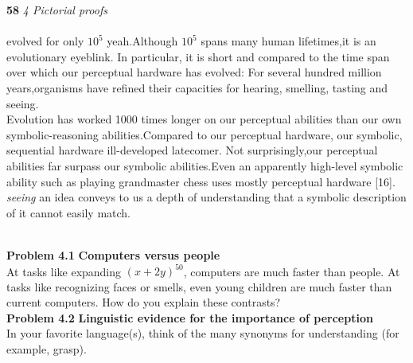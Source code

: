 \documentclass [a4paper]{article}
\begin{document}
\newpage
\pagestyle{fancy}
\begin{justify}
\Large{\textbf{58}} \hspace{11.3cm} \large{\textit{4 Pictorial proofs}}\\
\vspace*{0.4cm}\\
\Large evolved for only $10^5$ yeah.Although $10^5$ spans many human lifetimes,it is an evolutionary eyeblink. In particular, it is short and compared to the time span over which our perceptual hardware has evolved: For several hundred million years,organisms have refined their capacities for hearing, smelling, tasting and seeing.\\

\vspace*{2mm}
\noindent Evolution has worked 1000 times longer on our perceptual abilities than our own symbolic-reasoning abilities.Compared to our perceptual hardware, our symbolic, sequential hardware ill-developed latecomer. Not surprisingly,our perceptual abilities far surpass our symbolic abilities.Even an apparently high-level symbolic ability such as playing grandmaster chess uses mostly perceptual hardware [16]. \textit{seeing} an idea conveys to us a depth of understanding that a symbolic description of it cannot easily match.\\
\vspace*{0.5mm}\\
\colorbox{light-gray}{\begin{minipage}{\textwidth}
\begin{justify}
\textbf{\hspace*{3mm} \large Problem 4.1} \hspace{3mm} \textbf{ \large Computers versus people}\\
\hspace{2cm} \large \hspace*{3mm} At tasks like expanding $(x + 2y)^{50}$, computers are much faster than people. At tasks \hspace*{3mm} like recognizing faces or smells, even young children are much faster than current \hspace*{3mm} computers. How do you explain these contrasts?
\vspace*{2mm}\\
\textbf{\hspace*{3mm} \large Problem 4.2} \hspace{3mm} \textbf{ \large Linguistic evidence for the importance of perception}\\
\large \hspace*{3mm} In your favorite language(s), think of the many synonyms for understanding (for \hspace*{4.25mm} example, grasp).
\end{justify}
\end{minipage}
}
\end{justify}
\end{document}
